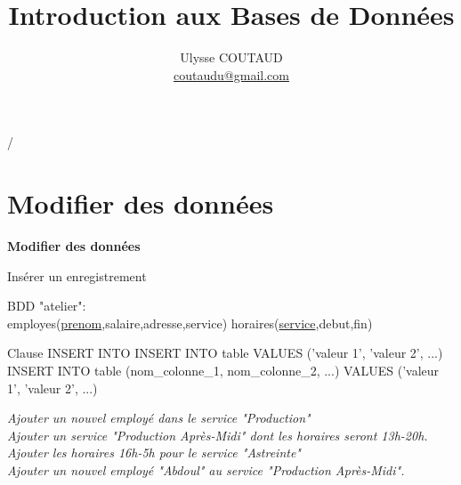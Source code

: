 \documentclass[xetex,dvipsnames]{beamer}
\begin{document}
\title{Introduction aux Bases de Données}

 {   \hspace{1em} \insertframenumber/\inserttotalframenumber }

\author{Ulysse COUTAUD\\\href{mailto:coutaudu@gmail.com}{\small coutaudu@gmail.com}}
\date{}
	
\maketitle

\section{Modifier des données}
\begin{frame}
\begin{center}
{\LARGE \textbf{Modifier des données}}
\end{center}
\end{frame}

\begin{frame}[t]{Insérer un enregistrement}
\begin{small}
		BDD "atelier": \\employes(\underline{prenom},salaire,adresse,service) horaires(\underline{service},debut,fin)
\end{small}	
	\begin{alertblock}{Clause INSERT INTO}
	INSERT INTO table VALUES ('valeur 1', 'valeur 2', ...)\\
	INSERT INTO table (nom\_colonne\_1, nom\_colonne\_2, ...) VALUES ('valeur 1', 'valeur 2', ...)
	\end{alertblock}
		
	\textit{Ajouter un nouvel employé dans le service "Production"}\\
	\textit{Ajouter un service "Production Après-Midi" dont les horaires seront 13h-20h.}\\
	\textit{Ajouter les horaires 16h-5h pour le service "Astreinte"}\\
	\textit{Ajouter un nouvel employé "Abdoul" au service "Production Après-Midi".}\\
\end{frame}
\end{document}
